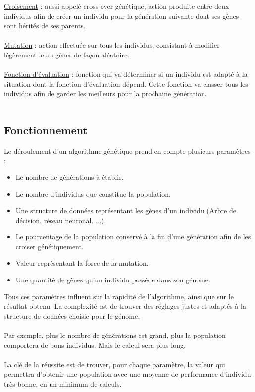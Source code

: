 \documentclass[12pt]{report}
\begin{document}
	\underline{Croisement} : aussi appelé cross-over génétique, action produite entre deux individus afin de créer un individu pour la génération suivante dont ses gènes sont hérités de ses parents.\\\\
    \underline{Mutation} : action effectuée sur tous les individus, consistant à modifier légèrement leurs gènes de façon aléatoire.\\\\
	\underline{Fonction d'évaluation} : fonction qui va déterminer si un individu est adapté à la situation dont la fonction d'évaluation dépend. Cette fonction va classer tous les individus afin de garder les meilleurs pour la prochaine génération.\\\\
	\subsection{Fonctionnement}
	Le déroulement d'un algorithme génétique prend en compte plusieurs paramètres :
	\begin{itemize}
		\item Le nombre de générations à établir.
		\item Le nombre d'individus que constitue la population.
		\item Une structure de données représentant les gènes d'un individu (Arbre de décision, réseau neuronal, ...).
		\item Le pourcentage de la population conservé à la fin d'une génération afin de les croiser génétiquement.
		\item Valeur représentant la force de la mutation.
		\item Une quantité de gènes qu'un individu possède dans son génome.
	\end{itemize}
	Tous ces paramètres influent sur la rapidité de l'algorithme, ainsi que sur le résultat obtenu. 
	La complexité est de trouver des réglages justes et adaptés à la structure de données choisie pour le génome.\\\\
	Par exemple, plus le nombre de générations est grand, plus la population comportera de bons individus. Mais le calcul sera plus long.\\\\
	La clé de la réussite est de trouver, pour chaque paramètre, la valeur qui permettra d'obtenir une population avec une moyenne de performance d'individu très bonne, en un minimum de calculs.
\end{document}
